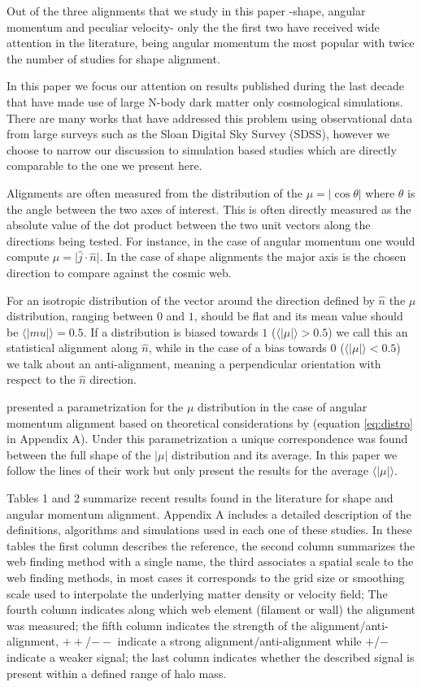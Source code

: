 \documentclass[useAMS,usenatbib]{mn2e}
\begin{document}
Out of the three alignments that we study in this paper -shape,
angular momentum and peculiar velocity- only the the first two have
received wide attention in the literature, being angular momentum the
most popular with twice the number of studies for shape alignment.

In this paper we focus our attention on results published during the last
decade that have made use of large N-body dark matter only
cosmological simulations. There are many works that have addressed
this problem using observational data from large surveys such as the
Sloan Digital Sky Survey (SDSS), however we choose to narrow our
discussion to simulation based studies which are
directly comparable to the one we present here.

Alignments are often measured from the distribution of the
$\mu=\vert\cos\theta\vert$ where $\theta$ is the angle between the two axes of
interest. This is often directly measured as the absolute value of
the dot product between the two unit vectors along the directions
being tested. For instance, in the case of angular momentum one would compute
$\mu=\vert\hat{j}\cdot\hat{n}\vert$. In the case of shape alignments the major
axis is the chosen direction to compare against the cosmic web.

For an isotropic distribution of the vector around the direction defined by
$\hat{n}$ the $\mu$ distribution, ranging between $0$ and $1$, should
be flat and its mean value should be
$\langle|mu|\rangle=0.5$. If a distribution is biased towards $1$
($\langle\vert\mu\vert\rangle>0.5$) we call this an statistical
alignment along $\hat{n}$, while in the case of a bias towards $0$
($\langle\vert\mu\vert\rangle<0.5$) we talk about an anti-alignment,
meaning a perpendicular orientation with respect to the $\hat{n}$
direction.

\cite{Trowland2013} presented a parametrization for the $\mu$
distribution in the case of angular momentum alignment based on
theoretical considerations by \cite{Lee2005} (equation \ref{eq:distro} in
Appendix A). Under this parametrization a unique
correspondence was found between the full shape of the $\vert\mu\vert$
distribution and its average. In this paper we follow the lines of their work but
only present the results for the average $\langle\vert\mu\vert\rangle$.

Tables 1 and 2 summarize recent results found in the literature for
shape and angular momentum alignment. Appendix A includes a detailed
description of the definitions, algorithms and simulations used in
each one of these studies. In these tables the first column describes
the reference, the second column summarizes the web finding method
with a single name, the third associates a spatial scale to the
web finding methods, in most cases it corresponds to the grid size or
smoothing scale used to interpolate the underlying matter density or
velocity field; The fourth column indicates along which web element
(filament or wall) the alignment was measured; the fifth column
indicates the strength of the alignment/anti-alignment, $++$/$--$
indicate a strong alignment/anti-alignment while $+$/$-$ indicate a
weaker signal; the last column indicates whether the described signal
is present within a defined range of halo mass.
\end{document}
